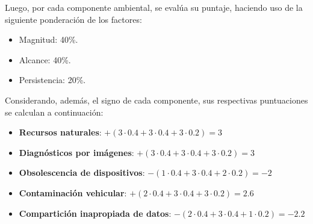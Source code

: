 \begin{table}[h]
    \centering
    \caption{Evaluación del impacto ambiental.}
    \label{evaluacion-impacto-ambiental}
\end{table}

Luego, por cada componente ambiental, se evalúa su puntaje, haciendo uso de la siguiente ponderación de los factores:

\begin{itemize}
    \item Magnitud: 40\%.
    \item Alcance: 40\%.
    \item Persistencia: 20\%.
\end{itemize}

Considerando, además, el signo de cada componente, sus respectivas puntuaciones se calculan a continuación:

\begin{itemize}
    \item \textbf{Recursos naturales}: $+ (3 \cdot 0.4 + 3 \cdot 0.4 + 3 \cdot 0.2) = 3$
    \item \textbf{Diagnósticos por imágenes}: $+ (3 \cdot 0.4 + 3 \cdot 0.4 + 3 \cdot 0.2) = 3$
    \item \textbf{Obsolescencia de dispositivos}: $- (1 \cdot 0.4 + 3 \cdot 0.4 + 2 \cdot 0.2) = -2$
    \item \textbf{Contaminación vehicular}: $+ (2 \cdot 0.4 + 3 \cdot 0.4 + 3 \cdot 0.2) = 2.6$
    \item \textbf{Compartición inapropiada de datos}: $- (2 \cdot 0.4 + 3 \cdot 0.4 + 1 \cdot 0.2) = -2.2$
\end{itemize}

